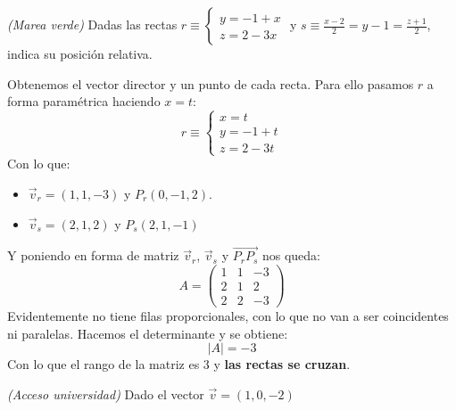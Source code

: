 \documentclass[a4paper,11pt,answers]{exam}
\begin{document}
\begin{questions}
\question \textit{(Marea verde)} Dadas las rectas $r \equiv \begin{cases}
y = -1 + x\\z = 2-3x
\end{cases}$ y $s \equiv \frac{x-2}{2} = y -1 = \frac{z+1}{2}$, indica su posición relativa.
\begin{solution}
Obtenemos el vector director y un punto de cada recta. Para ello pasamos $r$ a forma paramétrica haciendo $x = t$:
\[r \equiv \begin{cases}
x=t\\y = -1 + t\\z = 2-3t
\end{cases}\]
Con lo que:
\begin{itemize}
	\item $\vec{v}_ r = (1, 1, -3)$ y $P_r (0, -1, 2)$.
	\item $\vec{v}_s = (2,1,2)$ y $P_s (2, 1, -1)$
\end{itemize}
Y poniendo en forma de matriz $\vec{v}_r$, $\vec{v}_s$ y $\overrightarrow{P_r P_s}$ nos queda:
\[A=\left(\begin{array}{rrr}
1&1&-3\\2&1&2\\2&2&-3
\end{array}\right)\]
Evidentemente no tiene filas proporcionales, con lo que no van a ser coincidentes ni paralelas. Hacemos el determinante y se obtiene:
\[|A| = -3\]
Con lo que el rango de la matriz es 3 y \textbf{las rectas se cruzan}.
\end{solution}
\question \textit{(Acceso universidad)} Dado el vector $\vec{v} = (1, 0, -2)$
\begin{solution}
\begin{parts}

\end{parts}
\end{solution}
\end{questions}
\end{document}
